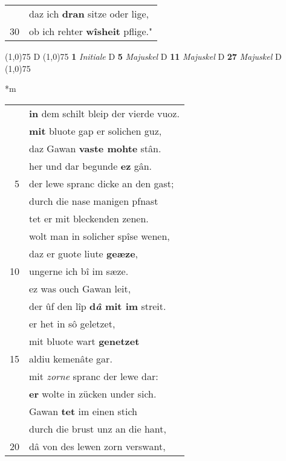 \documentclass[8pt,a4paper,notitlepage]{article}
\begin{document}
\begin{table}[ht]
\begin{minipage}[t]{0.5\linewidth}
\begin{tabular}{rl}
 & daz ich \textbf{dran} sitze oder lige,\\ 
30 & ob ich rehter \textbf{wîsheit} pflige."\\ 
\end{tabular}
\scriptsize
\line(1,0){75} \newline
D \newline
\line(1,0){75} \newline
\textbf{1} \textit{Initiale} D  \textbf{5} \textit{Majuskel} D  \textbf{11} \textit{Majuskel} D  \textbf{27} \textit{Majuskel} D  \newline
\line(1,0){75} \newline
\newline
\end{minipage}
\hspace{0.5cm}
\begin{minipage}[t]{0.5\linewidth}
\small
\begin{center}*m
\end{center}
\begin{tabular}{rl}
 & \textbf{in} dem schilt bleip der vierde vuoz.\\ 
 & \textbf{mit} bluote gap er solichen guz,\\ 
 & daz Gawan \textbf{vaste mohte} stân.\\ 
 & her und dar begunde \textbf{ez} gân.\\ 
5 & der lewe spranc dicke an den gast;\\ 
 & durch die nase manigen pfnast\\ 
 & tet er mit bleckenden zenen.\\ 
 & wolt man in solicher spîse wenen,\\ 
 & daz er guote liute \textbf{geæze},\\ 
10 & ungerne ich bî im sæze.\\ 
 & ez was ouch Gawan leit,\\ 
 & der ûf den lîp \textbf{d\textit{â} mit im} streit.\\ 
 & er het in sô geletzet,\\ 
 & mit bluote wart \textbf{genetzet}\\ 
15 & aldiu kemenâte gar.\\ 
 & mit \textit{zorne} spranc der lewe dar:\\ 
 & \textbf{er} wolte in zücken under sich.\\ 
 & Gawan \textbf{tet} im einen stich\\ 
 & durch die brust unz an die hant,\\ 
20 & dâ von des lewen zorn verswant,\\ 

\end{tabular}
\end{minipage}
\end{table}
\end{document}

